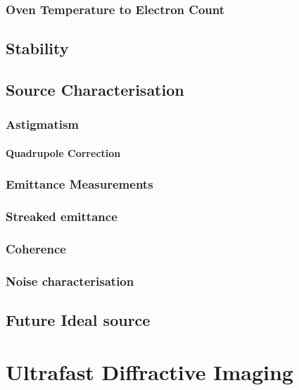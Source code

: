 \subsection{Oven Temperature to Electron Count}

\section{Stability}

\section{Source Characterisation}

\subsection{Astigmatism}

\subsubsection{Quadrupole Correction}\label{section:quadrupole}

\subsection{Emittance Measurements}

\subsection{Streaked emittance}

\subsection{Coherence}

\subsection{Noise characterisation}

\section{Future Ideal source}


\chapter{Ultrafast Diffractive Imaging}

